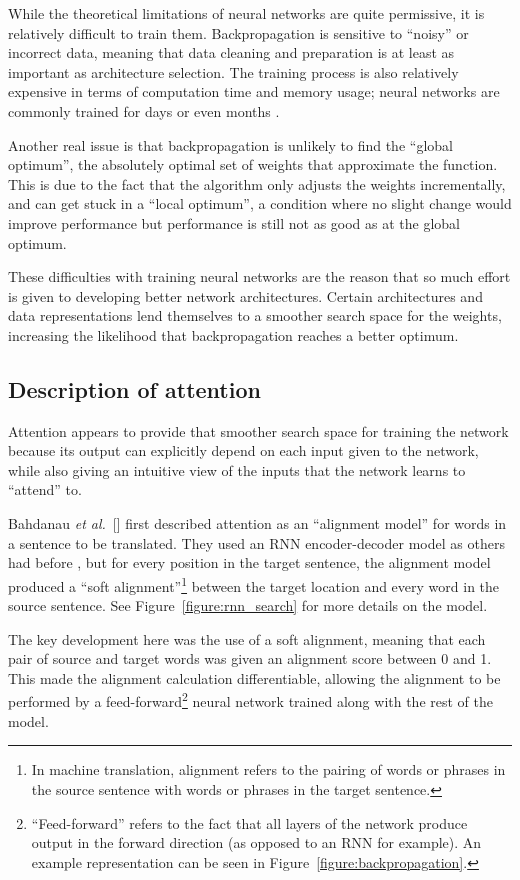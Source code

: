 \documentclass{article}
\newcommand{\etal}{\textit{et al.}}
\begin{document}
While the theoretical limitations of neural networks are quite permissive, it is relatively difficult to train them. Backpropagation is sensitive to ``noisy'' or incorrect data, meaning that data cleaning and preparation is at least as important as architecture selection. The training process is also relatively expensive in terms of computation time and memory usage; neural networks are commonly trained for days or even months \cite{attn_all_you_need}.

Another real issue is that backpropagation is unlikely to find the ``global optimum'', the absolutely optimal set of weights that approximate the function. This is due to the fact that the algorithm only adjusts the weights incrementally, and can get stuck in a ``local optimum'', a condition where no slight change would improve performance but performance is still not as good as at the global optimum.

These difficulties with training neural networks are the reason that so much effort is given to developing better network architectures. Certain architectures and data representations lend themselves to a smoother search space for the weights, increasing the likelihood that backpropagation reaches a better optimum.

\subsection{Description of attention}

Attention appears to provide that smoother search space for training the network because its output can explicitly depend on each input given to the network, while also giving an intuitive view of the inputs that the network learns to ``attend'' to.

Bahdanau \etal~[\citeyear{joint_align_translate}] first described attention as an ``alignment model'' for words in a sentence to be translated. They used an RNN encoder-decoder model as others had before \cite{encoder_decoders}, but for every position in the target sentence, the alignment model produced a ``soft alignment''\footnote{In machine translation, alignment refers to the pairing of words or phrases in the source sentence with words or phrases in the target sentence.} between the target location and every word in the source sentence. See Figure~\ref{figure:rnn_search} for more details on the model.

The key development here was the use of a soft alignment, meaning that each pair of source and target words was given an alignment score between 0 and 1. This made the alignment calculation differentiable, allowing the alignment to be performed by a feed-forward\footnote{``Feed-forward'' refers to the fact that all layers of the network produce output in the forward direction (as opposed to an RNN for example). An example representation can be seen in Figure~\ref{figure:backpropagation}.} neural network trained along with the rest of the model.
\end{document}

